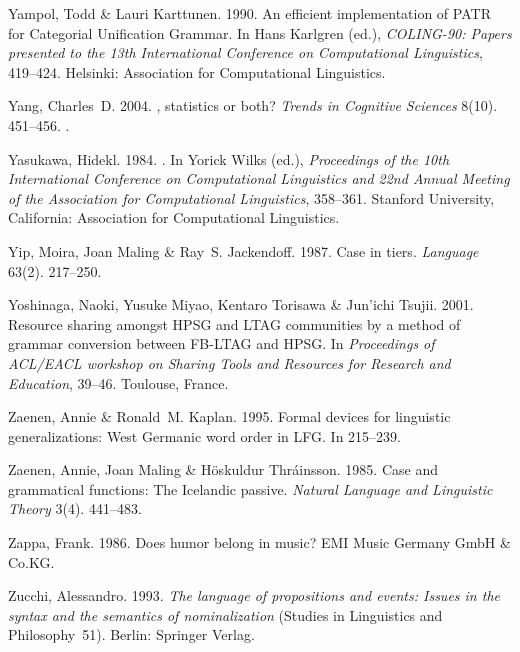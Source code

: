 \begin{thebibliography}{1420}
Yampol, Todd \& Lauri Karttunen. 1990.
\newblock An efficient implementation of {PATR} for {Categorial Unification
  Grammar}.
\newblock In Hans Karlgren (ed.), \emph{{COLING-90}: {Papers} presented to the
  {13th International Conference on Computational Linguistics}}, 419--424.
  Helsinki: Association for Computational Linguistics.

Yang, Charles~D. 2004.
, statistics or both?
\newblock \emph{Trends in Cognitive Sciences} 8(10). 451--456.
\newblock {}.

Yasukawa, Hidekl. 1984.
.
\newblock In Yorick Wilks (ed.), \emph{Proceedings of the {10th International
  Conference on Computational Linguistics and 22nd Annual Meeting of the
  Association for Computational Linguistics}}, 358--361. Stanford University,
  California: Association for Computational Linguistics.

Yip, Moira, Joan Maling \& Ray~S. Jackendoff. 1987.
\newblock Case in tiers.
\newblock \emph{Language} 63(2). 217--250.

Yoshinaga, Naoki, Yusuke Miyao, Kentaro Torisawa \& Jun'ichi Tsujii. 2001.
\newblock Resource sharing amongst {HPSG} and {LTAG} communities by a method of
  grammar conversion between {FB-LTAG} and {HPSG}.
\newblock In \emph{Proceedings of {ACL/EACL} workshop on {Sharing Tools and
  Resources for Research and Education}}, 39--46. Toulouse, France.

Zaenen, Annie \& Ronald~M. Kaplan. 1995.
\newblock Formal devices for linguistic generalizations: {West Germanic} word
  order in {LFG}.
\newblock In  \cite{DKMZ95a-ed} 215--239.

Zaenen, Annie, Joan Maling \& H{\"o}skuldur Thr{\'a}insson. 1985.
\newblock Case and grammatical functions: {The} {Icelandic} passive.
\newblock \emph{Natural Language and Linguistic Theory} 3(4). 441--483.

Zappa, Frank. 1986.
\newblock Does humor belong in music?
\newblock EMI Music Germany GmbH \& Co.KG.

Zucchi, Alessandro. 1993.
\newblock \emph{The language of propositions and events: Issues in the syntax
  and the semantics of nominalization} (Studies in Linguistics and
  Philosophy~51).
\newblock Berlin: Springer Verlag.


\end{thebibliography}
